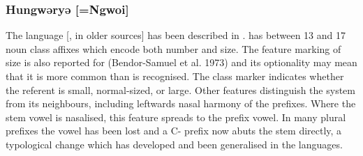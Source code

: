 \documentclass[output=paper]{langsci/langscibook}
\begin{document}
\subsubsection{Hungwəryə [=Ngwoi]}
\largerpage
The  language [,  in older sources] has been described in   \citet{HackettDavey2009}.  has between 13 and 17 noun class affixes which encode both number and size. The feature marking of size is also reported for  (Bendor-Samuel et al. 1973) and its optionality may mean that it is more common than is recognised. The class marker indicates whether the referent is small, normal-sized, or large. Other features distinguish the  system from its neighbours, including leftwards nasal harmony of the prefixes. Where the stem vowel is nasalised, this feature spreads to the prefix vowel. In many plural prefixes the vowel has been lost and a C- prefix now abuts the stem directly, a typological change which has developed and been generalised in the  languages.
\end{document}
